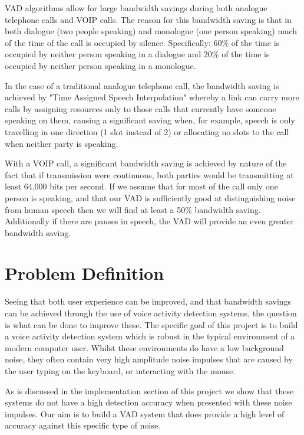\documentclass[ %
                    author={Sam Phippen},
                supervisor={Dr. Rafal Bogacz},
                     title={Real time voice activity detectors in noisy personal computing environments},
                  subtitle={},
                    degree={MEng},
                      year={2012} ]{thesis}
\begin{document}
VAD algorithms allow for large bandwidth savings during both analogue
telephone calls and VOIP calls. The reason for this bandwidth saving is that in
both dialogue (two people speaking) and monologue (one person speaking) much of
the time of the call is occupied by silence. Specifically: 60\% of the time is
occupied by neither person speaking\cite{shah} in a dialogue and 20\% of the
time is occupied by neither person speaking in a monologue.

In the case of a traditional analogue telephone call, the bandwidth saving is
achieved by "Time Assigned Speech Interpolation" whereby a link can carry more
calls by assigning resources only to those calls that currently have someone
speaking on them, causing a significant saving when, for example, speech is
only travelling in one direction (1 slot instead of 2) or allocating no slots
to the call when neither party is speaking\cite{5016247}.

With a VOIP call, a significant bandwidth saving is achieved by nature of the
fact that if transmission were continuous, both parties would be transmitting
at least 64,000 bits per second\cite{ciscovad}. If we assume that for most of
the call only one person is speaking, and that our VAD is sufficiently good at
distinguishing noise from human speech then we will find at least a 50\%
bandwidth saving. Additionally if there are pauses in speech, the VAD will
provide an even greater bandwidth saving.


\section{Problem Definition}

Seeing that both user experience can be improved, and that bandwidth savings
can be achieved through the use of voice activity detection systems, the
question is what can be done to improve these. The specific goal of this
project is to build a voice activity detection system which is robust in the
typical environment of a modern computer user. Whilst these environments do
have a low background noise, they often contain very high amplitude noise
impulses that are caused by the user typing on the keyboard, or interacting
with the mouse.

As is discussed in the implementation section of this project we show that
these systems do not have a high detection accuracy when presented with these
noise impulses. Our aim is to build a VAD system that does provide a high level
of accuracy against this specific type of noise.
\end{document}
